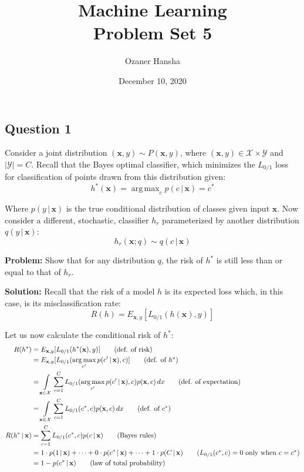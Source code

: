 \documentclass{article}
\renewcommand{\vec}[1]{\mathbf{#1}}
\DeclareMathOperator*{\argmax}{arg\,max}
\begin{document}
\title{Machine Learning\\ Problem Set 5}
\author{Ozaner Hansha}
\date{December 10, 2020}
\maketitle

\subsection*{Question 1}
Consider a joint distribution $(\vec x,y)\sim P(\vec x, y)$, where $(\vec x,y)\in\mathcal X\times\mathcal Y$ and $|\mathcal Y|=C$. Recall that the Bayes optimal classifier, which minimizes the $L_{0/1}$ loss for classification of points drawn from this distribution given:
$$h^*(\vec x)=\argmax_cp(c\,|\,\vec x)=c^*$$

Where $p(y\,|\, \vec x)$ is the true conditional distribution of classes given input $\vec x$. Now consider a different, stochastic, classifier $h_r$ parameterized by another distribution $q(y\,|\,\vec x)$:
$$h_r(\vec x;q)\sim q(c\,|\, \vec x)$$

\noindent\textbf{Problem:} Show that for any distribution $q$, the risk of $h^*$ is still less than or equal to that of $h_r$.
\bigskip

\noindent\textbf{Solution:} Recall that the risk of a model $h$ is its expected loss which, in this case, is its misclassification rate:
$$R(h)=E_{\vec x,y}[L_{0/1}(h(\vec x),y)]$$
\bigskip

Let us now calculate the conditional risk of $h^*$:
\begin{align*}
  R(h^*)&=E_{\vec x,y}[L_{0/1}(h^*(\vec x),y)]\tag{def. of risk}\\
  &=E_{\vec x,y}[L_{0/1}(\argmax_{c'}p(c'\,|\,\vec x),c)]\tag{def. of $h^*$}\\
  &=\int\displaylimits_{\vec x\in\mathcal X}\sum_{c=1}^CL_{0/1}(\argmax_{c'}p(c'\,|\,\vec x),c)p(\vec x,c)\,dx\tag{def. of expectation}\\
  &=\int\displaylimits_{\vec x\in\mathcal X}\sum_{c=1}^CL_{0/1}(c^*,c)p(\vec x,c)\,dx\tag{def. of $c^*$}\\
  R(h^*\,|\,\vec x)&=\sum_{c=1}^CL_{0/1}(c^*,c)p(c\,|\,\vec x)\tag{Bayes rules}\\
  &=1\cdot p(1\,|\,\vec x)+\cdots+0\cdot p(c^*\,|\,\vec x)+\cdots+1\cdot p(C\,|\,\vec x)\tag{$L_{0/1}(c^*,c)=0$ only when $c=c^*$}\\
  &=1-p(c^*\,|\,\vec x)\tag{law of total probability}
\end{align*}
\end{document}
